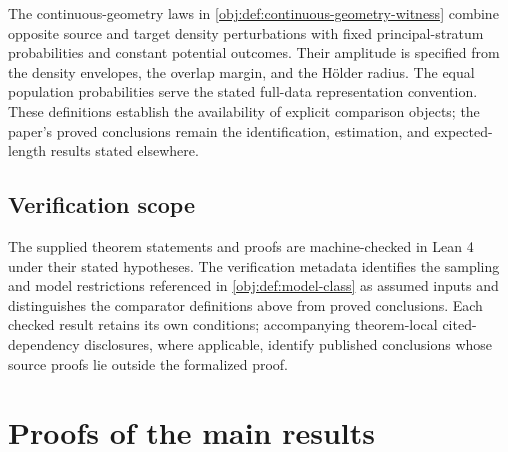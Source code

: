\documentclass[11pt]{article}
\begin{document}
The continuous-geometry laws  in \cref{obj:def:continuous-geometry-witness} combine opposite source and target density perturbations with fixed principal-stratum probabilities and constant potential outcomes. Their amplitude  is specified from the density envelopes, the overlap margin, and the Hölder radius. The equal population probabilities serve the stated full-data representation convention. These definitions establish the availability of explicit comparison objects; the paper's proved conclusions remain the identification, estimation, and expected-length results stated elsewhere.

\subsection{Verification scope}

The supplied theorem statements and proofs are machine-checked in Lean 4 under their stated hypotheses. The verification metadata identifies the sampling and model restrictions referenced in \cref{obj:def:model-class} as assumed inputs and distinguishes the comparator definitions above from proved conclusions. Each checked result retains its own conditions; accompanying theorem-local cited-dependency disclosures, where applicable, identify published conclusions whose source proofs lie outside the formalized proof.


\section{Proofs of the main results}\label{sec:deferred-proofs}
\end{document}
